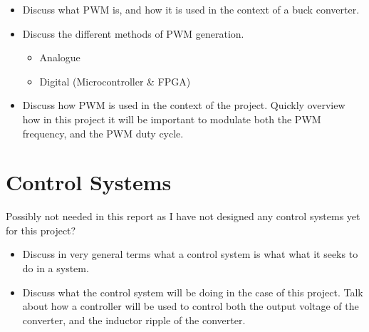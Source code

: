 \begin{itemize}

    \item 
    Discuss what PWM is, and how it is used in the context of a buck converter.
    
    \item 
    Discuss the different methods of PWM generation. 

    \begin{itemize}
        \item Analogue 
        \item Digital (Microcontroller \& FPGA)
    \end{itemize}

    \item 
    Discuss how PWM is used in the context of the project. Quickly overview how in this project it will be important to modulate both the PWM frequency, and the PWM duty cycle.

\end{itemize}

\section{Control Systems}

Possibly not needed in this report as I have not designed any control systems yet for this project?

\begin{itemize}
    
    \item
    Discuss in very general terms what a control system is what what it seeks to do in a system.

    \item 
    Discuss what the control system will be doing in the case of this project. Talk about how a controller will be used to control both the output voltage of the converter, and the inductor ripple of the converter.  

    \end{itemize}